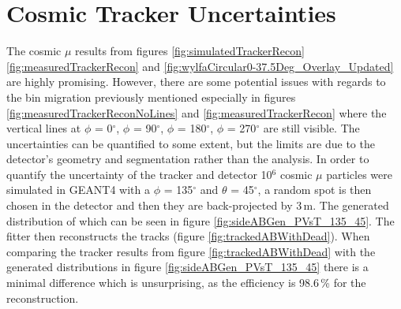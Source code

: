 \clearpage
\section{Cosmic Tracker Uncertainties}\label{sec:cosmicTrackerUncertainties}
The cosmic $\mu$ results from figures \ref{fig:simulatedTrackerRecon} \ref{fig:measuredTrackerRecon} and \ref{fig:wylfaCircular0-37.5Deg_Overlay_Updated} are highly promising. However, there are some potential issues with regards to the bin migration previously mentioned especially in figures \ref{fig:measuredTrackerReconNoLines} and \ref{fig:measuredTrackerRecon} where the vertical lines at $\phi$ = 0$^\circ$, $\phi$ = 90$^\circ$, $\phi$ = 180$^\circ$, $\phi$ = 270$^\circ$ are still visible. The uncertainties can be quantified to some extent, but the limits are due to the detector's geometry and segmentation rather than the analysis. In order to quantify the uncertainty of the tracker and detector 10$^6$ cosmic $\mu$ particles were simulated in GEANT4 with a $\phi$ =  135$^\circ$ and $\theta$ = 45$^\circ$, a random spot is then chosen in the detector and then they are back-projected by 3\,m. The generated distribution of which can be seen in figure \ref{fig:sideABGen_PVsT_135_45}. The fitter then reconstructs the tracks (figure \ref{fig:trackedABWithDead}). When comparing the tracker results from figure \ref{fig:trackedABWithDead} with the generated distributions in figure \ref{fig:sideABGen_PVsT_135_45} there is a minimal difference which is unsurprising, as the efficiency is 98.6\,\% for the reconstruction. 

